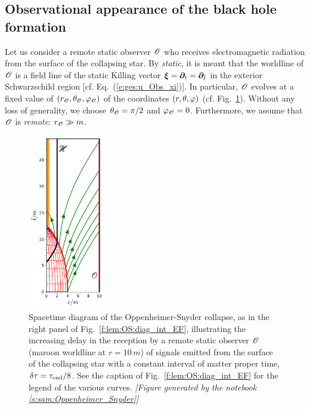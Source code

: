\subsection{Observational appearance of the black hole formation}

Let us consider a remote static observer $\mathscr{O}$ who receives electromagnetic
radiation from the surface of the collapsing star. By
\emph{static}, it is meant
that the worldline of $\mathscr{O}$ is a field line of the static Killing vector
$\bm{\xi} = \bm{\partial}_t = \bm{\partial}_{{\tilde t}}$ in the exterior Schwarzschild region
[cf. Eq.~(\ref{e:ges:u_Obs_xi})]. In particular, $\mathscr{O}$ evolves at a fixed
value of $(r_{\mathscr{O}},\theta_{\mathscr{O}},\varphi_{\mathscr{O}})$ of the coordinates $(r,\theta,\varphi)$
(cf. Fig.~\ref{f:lem:OS:diag_delay}). Without any loss of generality,
we choose $\theta_{\mathscr{O}} = \pi/2$ and $\varphi_{\mathscr{O}} = 0$.
Furthermore, we assume that $\mathscr{O}$ is \emph{remote}: $r_{\mathscr{O}} \gg m$.

\begin{figure}
\centerline{
\includegraphics[width=0.3\textwidth]{lem_OS_diag_delay.pdf}
}
\caption[]{\label{f:lem:OS:diag_delay} \footnotesize
Spacetime diagram of the Oppenheimer-Snyder collapse,
as in the right panel of Fig.~\ref{f:lem:OS:diag_int_EF}, illustrating
the increasing delay in the reception by a remote static observer $\mathscr{O}$
(maroon worldline at $r=10 \, m$)
of signals emitted from the
surface of the collapsing star with a constant interval of matter proper time,
$\delta\tau = \tau_{\rm end}/8$.
See the caption of Fig.~\ref{f:lem:OS:diag_int_EF} for the legend of the various
curves.
\textsl{[Figure generated by the notebook \ref{s:sam:Oppenheimer_Snyder}]}
}
\end{figure}

